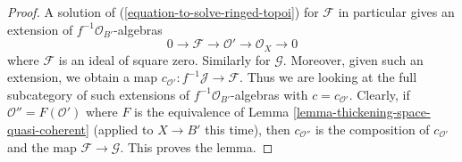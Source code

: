 \documentclass[10pt,a4paper]{amsart}
\theoremstyle{plain}
\theoremstyle{definition}
\theoremstyle{remark}
\numberwithin{equation}{subsection}
\begin{document}
\begin{proof}
A solution of (\ref{equation-to-solve-ringed-topoi}) for $\mathcal{F}$
in particular gives an extension of $f^{-1}\mathcal{O}_{B'}$-algebras
$$
0 \to \mathcal{F} \to \mathcal{O}' \to \mathcal{O}_X \to 0
$$
where $\mathcal{F}$ is an ideal of square zero. Similarly for $\mathcal{G}$.
Moreover, given such an extension, we obtain a map
$c_{\mathcal{O}'} : f^{-1}\mathcal{J} \to \mathcal{F}$.
Thus we are looking at the full subcategory of such extensions
of $f^{-1}\mathcal{O}_{B'}$-algebras with $c = c_{\mathcal{O}'}$.
Clearly, if $\mathcal{O}'' = F(\mathcal{O}')$ where
$F$ is the equivalence of Lemma \ref{lemma-thickening-space-quasi-coherent}
(applied to $X \to B'$ this time),
then $c_{\mathcal{O}''}$ is the composition of
$c_{\mathcal{O}'}$ and the map $\mathcal{F} \to \mathcal{G}$.
This proves the lemma.
\end{proof}
\end{document}
